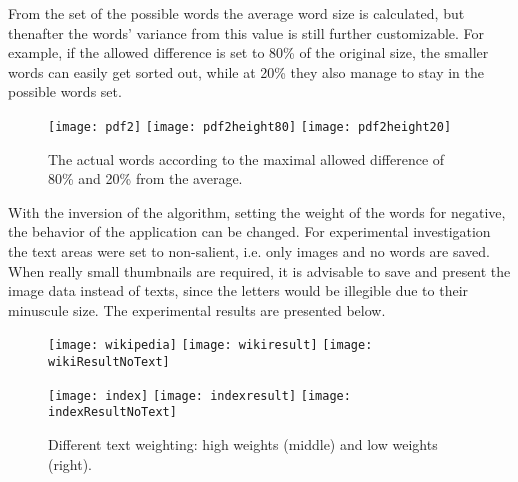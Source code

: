 \documentclass[draft,final]{vutinfth} %
\begin{document}
	From the set of the possible words the average word size is calculated, but thenafter the words' variance from this value is still further customizable.
	For example, if the allowed difference is set to 80\% of the original size, the smaller words can easily get sorted out, while at 20\% they also manage to stay in the possible words set.\par 
	\begin{figure}[H]
		\texttt{[image: pdf2]}\hfill
		\texttt{[image: pdf2height80]}\hfill
		\texttt{[image: pdf2height20]}
		\caption{The actual words according to the maximal allowed difference of 80\% and 20\% from the average.  }
	\end{figure}  
	With the inversion of the algorithm, setting the weight of the words for negative, the behavior of the application can be changed.
	For experimental investigation the text areas were set to non-salient, i.e. only images and no words are saved. 
	When really small thumbnails are required, it  is advisable to save and present the image data instead of texts, since the letters would be illegible due to their minuscule size.  
	The experimental results are presented below.
	\begin{figure}[H]		
		\texttt{[image: wikipedia]}\hfill
		\texttt{[image: wikiresult]}\hfill
		\texttt{[image: wikiResultNoText]}
		
		\texttt{[image: index]}\hfill
		\texttt{[image: indexresult]}\hfill
		\texttt{[image: indexResultNoText]}
		
		\caption{Different text weighting: high weights (middle) and low weights (right).  }
	\end{figure} 
\end{document}
